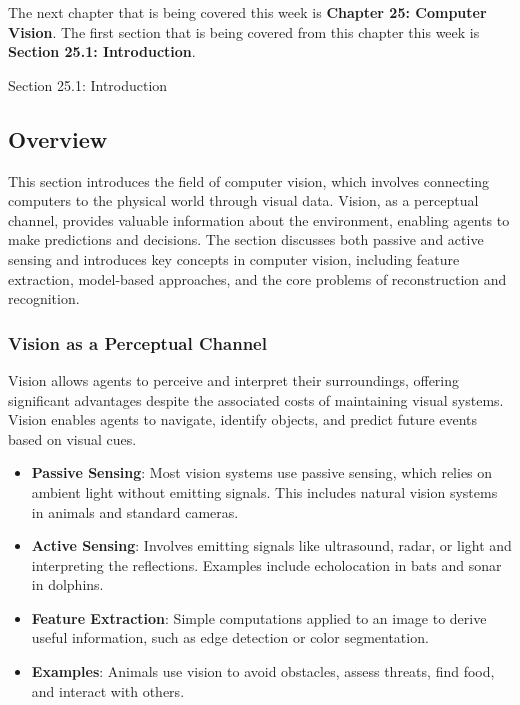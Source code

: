 The next chapter that is being covered this week is \textbf{Chapter 25: Computer Vision}. The first section that is being covered from this chapter this week is \textbf{Section 25.1: Introduction}.

\begin{notes}{Section 25.1: Introduction}
    \subsection*{Overview}

    This section introduces the field of computer vision, which involves connecting computers to the physical world through visual data. Vision, as a perceptual channel, provides valuable information about 
    the environment, enabling agents to make predictions and decisions. The section discusses both passive and active sensing and introduces key concepts in computer vision, including feature extraction, 
    model-based approaches, and the core problems of reconstruction and recognition.
    
    \subsubsection*{Vision as a Perceptual Channel}
    
    Vision allows agents to perceive and interpret their surroundings, offering significant advantages despite the associated costs of maintaining visual systems. Vision enables agents to navigate, identify 
    objects, and predict future events based on visual cues.
    
    \begin{highlight}
    
        \begin{itemize}
            \item \textbf{Passive Sensing}: Most vision systems use passive sensing, which relies on ambient light without emitting signals. This includes natural vision systems in animals and standard cameras.
            \item \textbf{Active Sensing}: Involves emitting signals like ultrasound, radar, or light and interpreting the reflections. Examples include echolocation in bats and sonar in dolphins.
            \item \textbf{Feature Extraction}: Simple computations applied to an image to derive useful information, such as edge detection or color segmentation.
            \item \textbf{Examples}: Animals use vision to avoid obstacles, assess threats, find food, and interact with others.
        \end{itemize}
    

\end{highlight}
\end{notes}
